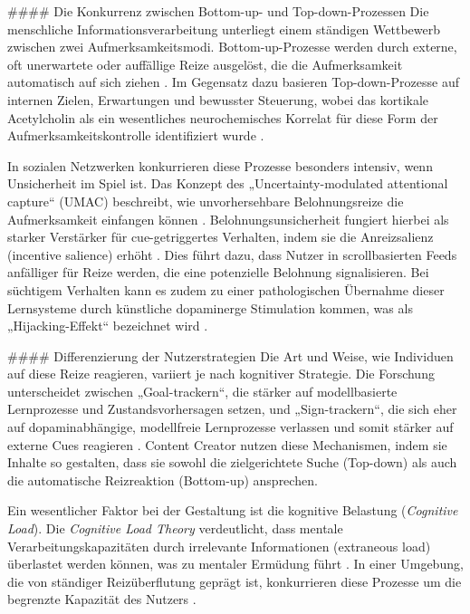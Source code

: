 \documentclass[11pt,a4paper]{article}
\begin{document}
\#\#\#\# Die Konkurrenz zwischen Bottom-up- und Top-down-Prozessen Die menschliche Informationsverarbeitung unterliegt einem ständigen Wettbewerb zwischen zwei Aufmerksamkeitsmodi. Bottom-up-Prozesse werden durch externe, oft unerwartete oder auffällige Reize ausgelöst, die die Aufmerksamkeit automatisch auf sich ziehen \autocite{europepmc_42137086}. Im Gegensatz dazu basieren Top-down-Prozesse auf internen Zielen, Erwartungen und bewusster Steuerung, wobei das kortikale Acetylcholin als ein wesentliches neurochemisches Korrelat für diese Form der Aufmerksamkeitskontrolle identifiziert wurde \autocite{europepmc_42137086}.

In sozialen Netzwerken konkurrieren diese Prozesse besonders intensiv, wenn Unsicherheit im Spiel ist. Das Konzept des „Uncertainty-modulated attentional capture“ (UMAC) beschreibt, wie unvorhersehbare Belohnungsreize die Aufmerksamkeit einfangen können \autocite{europepmc_42137086}. Belohnungsunsicherheit fungiert hierbei als starker Verstärker für cue-getriggertes Verhalten, indem sie die Anreizsalienz (incentive salience) erhöht \autocite{europepmc_42137086}. Dies führt dazu, dass Nutzer in scrollbasierten Feeds anfälliger für Reize werden, die eine potenzielle Belohnung signalisieren. Bei süchtigem Verhalten kann es zudem zu einer pathologischen Übernahme dieser Lernsysteme durch künstliche dopaminerge Stimulation kommen, was als „Hijacking-Effekt“ bezeichnet wird \autocite{europepmc_42137086}.

\#\#\#\# Differenzierung der Nutzerstrategien Die Art und Weise, wie Individuen auf diese Reize reagieren, variiert je nach kognitiver Strategie. Die Forschung unterscheidet zwischen „Goal-trackern“, die stärker auf modellbasierte Lernprozesse und Zustandsvorhersagen setzen, und „Sign-trackern“, die sich eher auf dopaminabhängige, modellfreie Lernprozesse verlassen und somit stärker auf externe Cues reagieren \autocite{europepmc_42137086}. Content Creator nutzen diese Mechanismen, indem sie Inhalte so gestalten, dass sie sowohl die zielgerichtete Suche (Top-down) als auch die automatische Reizreaktion (Bottom-up) ansprechen.

Ein wesentlicher Faktor bei der Gestaltung ist die kognitive Belastung (\textit{Cognitive Load}). Die \textit{Cognitive Load Theory} verdeutlicht, dass mentale Verarbeitungskapazitäten durch irrelevante Informationen (extraneous load) überlastet werden können, was zu mentaler Ermüdung führt \autocite{grey_grey_d4bc9c0d0e8441ba90398520e73af07d}. In einer Umgebung, die von ständiger Reizüberflutung geprägt ist, konkurrieren diese Prozesse um die begrenzte Kapazität des Nutzers \autocite{grey_grey_d4bc9c0d0e8441ba90398520e73af07d}.
\end{document}
